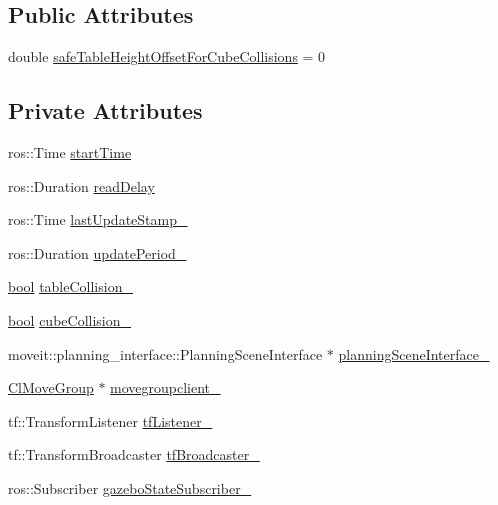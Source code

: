 \subsection*{Public Attributes}
\begin{DoxyCompactItemize}
\item 
double \hyperlink{classsm__moveit__4_1_1cl__perception__system_1_1CpSimulatedGazeboPerception_a6b6bafbddde1f72c81bf54aa75872151}{safe\+Table\+Height\+Offset\+For\+Cube\+Collisions} = 0
\end{DoxyCompactItemize}
\subsection*{Private Attributes}
\begin{DoxyCompactItemize}
\item 
ros\+::\+Time \hyperlink{classsm__moveit__4_1_1cl__perception__system_1_1CpSimulatedGazeboPerception_af27dcb3530d5f2e8919f5e617b46275c}{start\+Time}
\item 
ros\+::\+Duration \hyperlink{classsm__moveit__4_1_1cl__perception__system_1_1CpSimulatedGazeboPerception_acd843a9a4bf2ffafa924e522f7074a49}{read\+Delay}
\item 
ros\+::\+Time \hyperlink{classsm__moveit__4_1_1cl__perception__system_1_1CpSimulatedGazeboPerception_afa9d8a4f636cf06bd7dbe49ce2ca5fa8}{last\+Update\+Stamp\+\_\+}
\item 
ros\+::\+Duration \hyperlink{classsm__moveit__4_1_1cl__perception__system_1_1CpSimulatedGazeboPerception_a185c4065558b0c320d73f366bb6b8277}{update\+Period\+\_\+}
\item 
\hyperlink{classbool}{bool} \hyperlink{classsm__moveit__4_1_1cl__perception__system_1_1CpSimulatedGazeboPerception_a64beecc85d97c62bc4f884f4601d9c6a}{table\+Collision\+\_\+}
\item 
\hyperlink{classbool}{bool} \hyperlink{classsm__moveit__4_1_1cl__perception__system_1_1CpSimulatedGazeboPerception_a5f043c05aa335a438459a55b51e6ace6}{cube\+Collision\+\_\+}
\item 
moveit\+::planning\+\_\+interface\+::\+Planning\+Scene\+Interface $\ast$ \hyperlink{classsm__moveit__4_1_1cl__perception__system_1_1CpSimulatedGazeboPerception_a34bbc7a8b23a1b1c2d3d4d30bd2fe767}{planning\+Scene\+Interface\+\_\+}
\item 
\hyperlink{classmoveit__z__client_1_1ClMoveGroup}{Cl\+Move\+Group} $\ast$ \hyperlink{classsm__moveit__4_1_1cl__perception__system_1_1CpSimulatedGazeboPerception_a3c361c94d4a8077d9bfac016a2614056}{movegroupclient\+\_\+}
\item 
tf\+::\+Transform\+Listener \hyperlink{classsm__moveit__4_1_1cl__perception__system_1_1CpSimulatedGazeboPerception_a42b9ec584754078d2439a828a840771e}{tf\+Listener\+\_\+}
\item 
tf\+::\+Transform\+Broadcaster \hyperlink{classsm__moveit__4_1_1cl__perception__system_1_1CpSimulatedGazeboPerception_a413594aa743f273c844795ff9f2f724b}{tf\+Broadcaster\+\_\+}
\item 
ros\+::\+Subscriber \hyperlink{classsm__moveit__4_1_1cl__perception__system_1_1CpSimulatedGazeboPerception_a0808beb5b57079d863a56258279e202f}{gazebo\+State\+Subscriber\+\_\+}
\end{DoxyCompactItemize}
